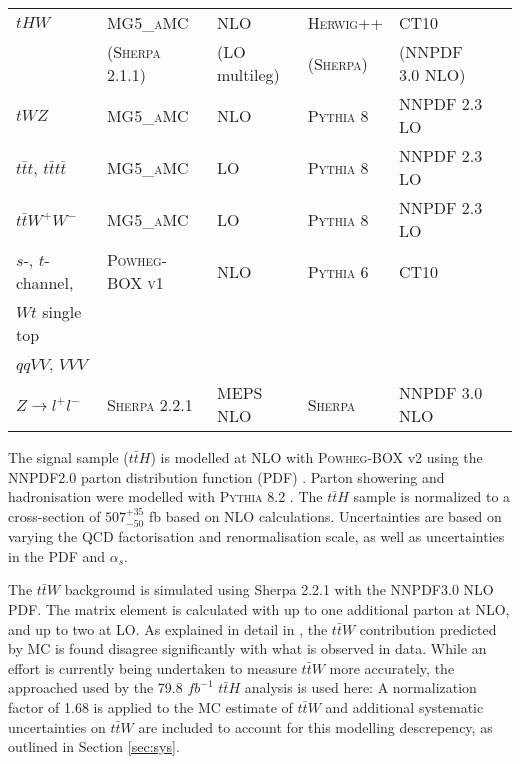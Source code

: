 \begin{table}[H]
\begin{center}
{\begin{tabular}{llllll}
$tHW$ & \textsc{MG5\_aMC} & NLO & \textsc{Herwig++}  & CT10  \\
& (\textsc{Sherpa} 2.1.1) & (LO multileg) & (\textsc{Sherpa}) & (NNPDF 3.0 NLO)  \\                                        
$t W Z$ & \textsc{MG5\_aMC} & NLO & \textsc{Pythia} 8 & NNPDF 2.3 LO   \\
$t\bar t t$, $t\bar t t\bar t$ & \textsc{MG5\_aMC} & LO & \textsc{Pythia} 8 & NNPDF 2.3 LO  \\                             
$t\bar t W^+ W^-$ & \textsc{MG5\_aMC} & LO & \textsc{Pythia} 8 & NNPDF 2.3 LO\\
$s$-, $t$-channel, & \textsc{Powheg-BOX v1} \cite{powhegstp}& NLO & \textsc{Pythia} 6 & CT10 \\
$Wt$ single top & & & &  \\
$qqVV$, $VVV$ & &   \\
$Z \to l^+l^-$ & \textsc{Sherpa} 2.2.1 & MEPS NLO  & \textsc{Sherpa} & NNPDF 3.0 NLO \\
\hline\hline
\end{tabular}
}
\end{center}
\end{table}

The signal sample ($t\bar{t}H$) is modelled at NLO with \textsc{Powheg-BOX} v2 using the NNPDF2.0 parton distribution function (PDF) \cite{ATL-PHYS-PUB-2015-011}. Parton showering and hadronisation were modelled with \textsc{Pythia} 8.2 \cite{ATL-PHYS-PUB-2011-009}. The $t\bar{t}H$ sample is normalized to a cross-section of $507^{+35}_{-50}$ fb based on NLO calculations. Uncertainties are based on varying the QCD factorisation and renormalisation scale, as well as uncertainties in the PDF and $\alpha_s$.

The $t\bar{t}W$ background is simulated using Sherpa 2.2.1 with the NNPDF3.0 NLO PDF. The matrix element is calculated with up to one additional parton at NLO, and up to two at LO. As explained in detail in \cite{ttH_paper}, the $t\bar{t}W$ contribution predicted by MC is found disagree significantly with what is observed in data. While an effort is currently being undertaken to measure $t\bar{t}W$ more accurately, the approached used by the 79.8 $fb^{-1}$ $t\bar{t}H$ analysis is used here: A normalization factor of 1.68 is applied to the MC estimate of $t\bar{t}W$ and additional systematic uncertainties on $t\bar{t}W$ are included to account for this modelling descrepency, as outlined in Section \ref{sec:sys}.

